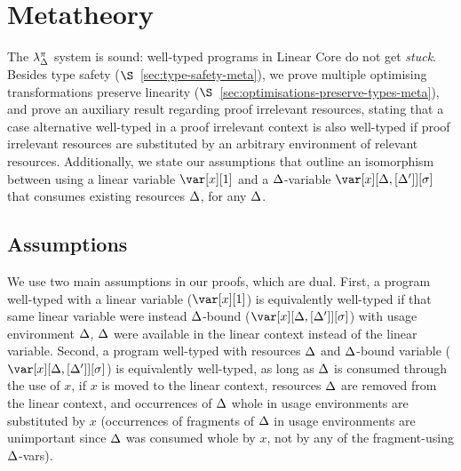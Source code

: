 \documentclass[acmsmall, screen, review]{acmart}
\begin{document}

\section{Metatheory\label{sec:main:metatheory}}

The $\lambda^\pi_\Delta$ system is sound: well-typed programs in Linear Core do not
get \emph{stuck}. Besides type safety ($\S$~\ref{sec:type-safety-meta}), we
prove multiple optimising transformations preserve linearity
($\S$~\ref{sec:optimisations-preserve-types-meta}), and prove an auxiliary
result regarding proof irrelevant resources, stating that a case alternative
well-typed in a proof irrelevant context is also well-typed if proof irrelevant
resources are substituted by an arbitrary environment of relevant resources.
%
Additionally, we state our assumptions that outline an isomorphism between
using a linear variable $\xl$ and a $\Delta$-variable $\xD$ that consumes existing
resources $\Delta$, for any $\Delta$.

\subsection{Assumptions}

We use two main assumptions in our proofs, which are dual.
%
First, a program well-typed with a linear variable ($\xl$) is equivalently
well-typed if that same linear variable were instead $\Delta$-bound ($\xD$) with
usage environment $\Delta$, $\Delta$ were available in the linear context instead of
the linear variable.
%
%
\LinearDeltaRelationLemma
%
\noindent Second, a program well-typed with resources $\Delta$ and $\Delta$-bound
variable ($\xD$) is equivalently well-typed, as long as $\Delta$ is consumed
through the use of $x$, if $x$ is moved to the linear context, resources $\Delta$
are removed from the linear context, and occurrences of $\Delta$ whole in usage
environments are substituted by $x$ (occurrences of fragments of $\Delta$ in usage
environments are unimportant since $\Delta$ was consumed whole by $x$, not by any
of the fragment-using $\Delta$-vars).
\end{document}
